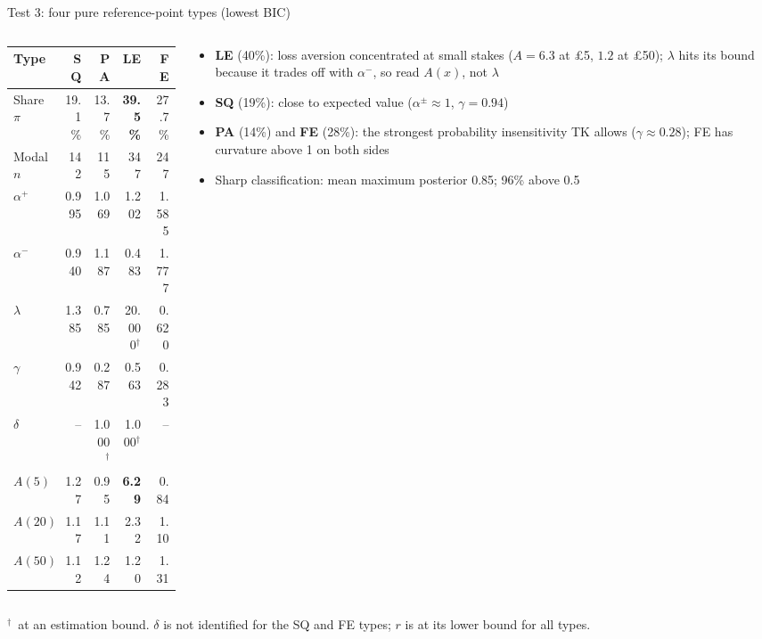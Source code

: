 \documentclass[aspectratio=169,11pt]{beamer}
\newcommand{\ap}{\alpha^{+}}
\newcommand{\am}{\alpha^{-}}
\newcommand{\bd}{\ensuremath{^{\dagger}}}
\newcommand{\tabnote}[1]{\par\vfill{\scriptsize\color{muted}#1\par}}
\newcommand{\tight}{\setlength{\itemsep}{3pt}}
\begin{document}
\begin{frame}{Test 3: four pure reference-point types (lowest BIC)}
\begin{columns}[T,onlytextwidth]
\begin{column}{0.45\textwidth}
\centering\footnotesize\setlength{\tabcolsep}{4pt}
\begin{tabular}{l rrrr}
\toprule
Type & SQ & PA & LE & FE\\
\midrule
Share $\pi$ & 19.1\% & 13.7\% & \textbf{39.5\%} & 27.7\%\\
Modal $n$ & 142 & 115 & 347 & 247\\
\midrule
$\ap$ & 0.995 & 1.069 & 1.202 & 1.585\\
$\am$ & 0.940 & 1.187 & 0.483 & 1.777\\
$\lambda$ & 1.385 & 0.785 & 20.000\bd & 0.620\\
$\gamma$ & 0.942 & 0.287 & 0.563 & 0.283\\
$\delta$ & -- & 1.000\bd & 1.000\bd & --\\
$A(5)$ & 1.27 & 0.95 & \textbf{6.29} & 0.84\\
$A(20)$ & 1.17 & 1.11 & 2.32 & 1.10\\
$A(50)$ & 1.12 & 1.24 & 1.20 & 1.31\\
\bottomrule
\end{tabular}
\end{column}
\begin{column}{0.51\textwidth}
\begin{itemize}\small\tight
  \item \textbf{LE} (40\%): loss aversion concentrated at small stakes ($A=6.3$ at \pounds 5, $1.2$ at \pounds 50); $\lambda$ hits its bound because it trades off with $\am$, so read $A(x)$, not $\lambda$
  \item \textbf{SQ} (19\%): close to expected value ($\alpha^{\pm}\approx 1$, $\gamma=0.94$)
  \item \textbf{PA} (14\%) and \textbf{FE} (28\%): the strongest probability insensitivity TK allows ($\gamma\approx 0.28$); FE has curvature above 1 on both sides
  \item Sharp classification: mean maximum posterior 0.85; 96\% above 0.5
\end{itemize}
\end{column}
\end{columns}
\tabnote{\bd\ at an estimation bound. $\delta$ is not identified for the SQ and FE types; $r$ is at its lower bound for all types.}
\end{frame}
\end{document}
